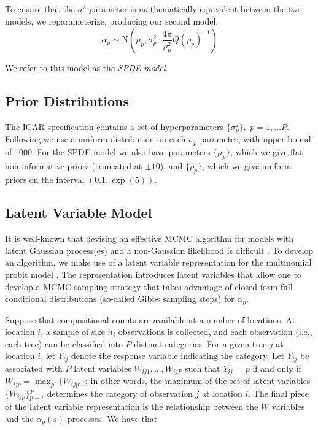 \documentclass[12pt]{article}
\begin{document}
To ensure that the $\sigma^{2}$ parameter is mathematically equivalent
between the two models, we reparameterize, producing our second model:
\[
\alpha_{p}\sim\mbox{N}\left(\mu_{p},\sigma_{p}^{2}\cdot\frac{4\pi}{\rho_{p}^{2}}Q(\rho_{p})^{-1}\right)
\]


We refer to this model as the \emph{SPDE model}.


\subsection{Prior Distributions}

\noindent The ICAR specification contains a set of hyperparameters
$\{\sigma_{p}^{2}\},$ $p=1,\ldots P$. Following \cite{Gelm:2006}
we use a uniform distribution on each $\sigma_{p}$ parameter, with
upper bound of 1000. For the SPDE model we also have parameters $\{\mu_{p}\}$,
which we give flat, non-informative priors (truncated at $\pm10$),
and $\{\rho_{p}\}$, which we give uniform priors on the interval
$(0.1,\exp(5))$. 


\subsection{Latent Variable Model\label{sub:Latent-Variable-Model}}

It is well-known that devising an effective MCMC algorithm for models
with latent Gaussian process(es) and a non-Gaussian likelihood is
difficult \citep{Rue:Held:2005,Chri:etal:2006,Tan:Nott:2013}. To
develop an algorithm, we make use of a latent variable representation
for the multinomial probit model \citep{McCu:Ross:1994}. The representation
introduces latent variables that allow one to develop a MCMC sampling
strategy that takes advantage of closed form full conditional distributions
(so-called Gibbs sampling steps) for $\alpha_{p}$.

Suppose that compositional counts are available at a number of locations.
At location $i$, a sample of size $n_{i}$ observations is collected,
and each observation (i.e., each tree) can be classified into $P$
distinct categories. For a given tree $j$ at location $i$, let $Y_{ij}$
denote the response variable indicating the category. Let $Y_{ij}$
be associated with $P$ latent variables $W_{ij1},...,W_{ijP}$ such
that $Y_{ij}$ = $p$ if and only if $W_{ijp}={\displaystyle \max_{p'}\big\{ W_{ijp'}\big\}}$;
in other words, the maximum of the set of latent variables $\{W_{ijp}\}{\displaystyle _{p=1}^{P}}$
determines the category of observation $j$ at location $i$. The
final piece of the latent variable representation is the relationship
between the $W$ variables and the $\alpha_{p}(s)$ processes. We
have that
\end{document}
